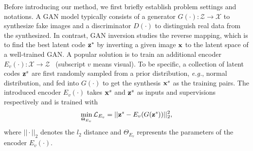 \documentclass[final]{cvpr}
\newcommand{\x}{{\rm\bf x}}
\newcommand{\X}{\mathcal{X}}
\newcommand{\Loss}{\mathcal{L}}
\newcommand{\z}{{\rm\bf z}}
\newcommand{\Z}{\mathcal{Z}}
\def\eg{\emph{e.g.}}
\begin{document}
Before introducing our method, we first briefly establish problem settings and notations.
A GAN model typically consists of a generator $G(\cdot): \Z\rightarrow\X$ to synthesize fake images and a discriminator $D(\cdot)$ to distinguish real data from the synthesized. 
In contrast, GAN inversion studies the reverse mapping, which is to find the best latent code $\z^{*}$ by inverting a given image $\x$ to the latent space of a well-trained GAN.
A popular solution is to train an additional encoder $E_v(\cdot): \X\rightarrow\Z$~\cite{zhu2016generative,bau2019seeing} (subscript $v$ means visual).
To be specific, a collection of latent codes $\z^{s}$ are first randomly sampled from a prior distribution, \eg, normal distribution, and fed into $G(\cdot)$ to get the synthesis $\x^{s}$ as the training pairs.
The introduced encoder $E_v(\cdot)$ takes $\x^{s}$ and $\z^{s}$ as inputs and supervisions respectively and is trained with
\begin{align}
  \min_{\Theta_{E_v}}\Loss_{E_v} = ||\z^{s} - E_v(G(\z^{s}))||_2^2, 
  \label{eq:conventional-encoder}
\end{align}
where $||\cdot||_2$ denotes the $l_2$ distance and $\Theta_{E_v}$ represents the parameters of the encoder $E_v(\cdot)$.
\end{document}
